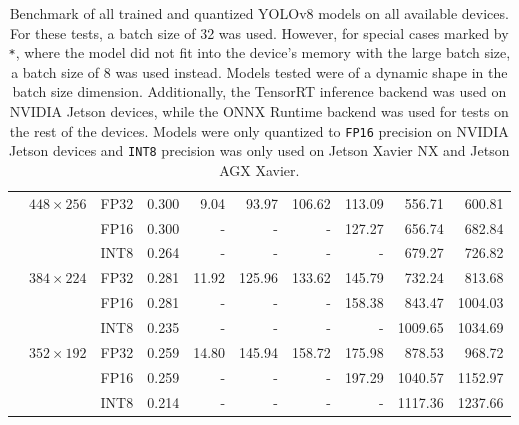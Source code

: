 \begin{appendices}
\begin{table}
\begin{tabular}{|c|c|c|c|rrrrrr|}
        \cline{2-10}
                                                                  & \multirow{3}{*}{$448 \times 256$} & FP32 & 0.300 &  9.04 &  93.97 & 106.62 & 113.09 &  556.71 &  600.81 \\
                                                                  &                                   & FP16 & 0.300 &    -  &      - &      - & 127.27 &  656.74 &  682.84 \\
                                                                  &                                   & INT8 & 0.264 &    -  &      - &      - &      - &  679.27 &  726.82 \\
        \cline{2-10}
                                                                  & \multirow{3}{*}{$384 \times 224$} & FP32 & 0.281 & 11.92 & 125.96 & 133.62 & 145.79 &  732.24 &  813.68 \\
                                                                  &                                   & FP16 & 0.281 &    -  &      - &      - & 158.38 &  843.47 & 1004.03 \\
                                                                  &                                   & INT8 & 0.235 &    -  &      - &      - &      - & 1009.65 & 1034.69 \\
        \cline{2-10}
                                                                  & \multirow{3}{*}{$352 \times 192$} & FP32 & 0.259 & 14.80 & 145.94 & 158.72 & 175.98 &  878.53 &  968.72 \\
                                                                  &                                   & FP16 & 0.259 &    -  &      - &      - & 197.29 & 1040.57 & 1152.97 \\
                                                                  &                                   & INT8 & 0.214 &    -  &      - &      - &      - & 1117.36 & 1237.66 \\
        \hline
        \end{tabular}
    \caption{Benchmark of all trained and quantized YOLOv8 models on all
    available devices. For these tests, a batch size of 32 was used. However,
    for special cases marked by \texttt{*}, where the model did not fit into the
    device's memory with the large batch size, a batch size of 8 was used
    instead. Models tested were of a dynamic shape in the batch size dimension.
    Additionally, the TensorRT inference backend was used on NVIDIA Jetson
    devices, while the ONNX Runtime backend was used for tests on the rest of
    the devices. Models were only quantized to \texttt{FP16} precision on NVIDIA
    Jetson devices and \texttt{INT8} precision was only used on Jetson Xavier NX
    and Jetson AGX Xavier.}
    \label{mAPvsFPS32}
    \normalsize
\end{table}





\end{appendices}
